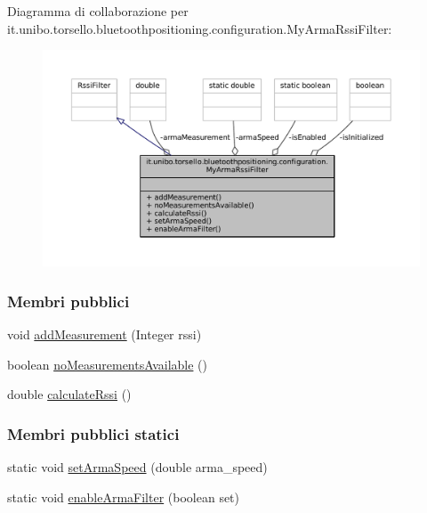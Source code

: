 Diagramma di collaborazione per it.\+unibo.\+torsello.\+bluetoothpositioning.\+configuration.\+My\+Arma\+Rssi\+Filter\+:
\nopagebreak
\begin{figure}[H]
\begin{center}
\leavevmode
\includegraphics[width=350pt]{classit_1_1unibo_1_1torsello_1_1bluetoothpositioning_1_1configuration_1_1MyArmaRssiFilter__coll__graph}
\end{center}
\end{figure}
\subsubsection*{Membri pubblici}
\begin{DoxyCompactItemize}
\item 
void \hyperlink{classit_1_1unibo_1_1torsello_1_1bluetoothpositioning_1_1configuration_1_1MyArmaRssiFilter_ad35f023bd49df5d11db274ad6a900072_ad35f023bd49df5d11db274ad6a900072}{add\+Measurement} (Integer rssi)
\item 
boolean \hyperlink{classit_1_1unibo_1_1torsello_1_1bluetoothpositioning_1_1configuration_1_1MyArmaRssiFilter_a822204c28f67229cabce721dd39d8cf6_a822204c28f67229cabce721dd39d8cf6}{no\+Measurements\+Available} ()
\item 
double \hyperlink{classit_1_1unibo_1_1torsello_1_1bluetoothpositioning_1_1configuration_1_1MyArmaRssiFilter_afcb40e796f16bc1352d34567e8984a87_afcb40e796f16bc1352d34567e8984a87}{calculate\+Rssi} ()
\end{DoxyCompactItemize}
\subsubsection*{Membri pubblici statici}
\begin{DoxyCompactItemize}
\item 
static void \hyperlink{classit_1_1unibo_1_1torsello_1_1bluetoothpositioning_1_1configuration_1_1MyArmaRssiFilter_a87e5ed9b294bed2cedcbda1ee06bc8ee_a87e5ed9b294bed2cedcbda1ee06bc8ee}{set\+Arma\+Speed} (double arma\+\_\+speed)
\item 
static void \hyperlink{classit_1_1unibo_1_1torsello_1_1bluetoothpositioning_1_1configuration_1_1MyArmaRssiFilter_a0ce35b24ad6c6d9abe69e038b3e8da7d_a0ce35b24ad6c6d9abe69e038b3e8da7d}{enable\+Arma\+Filter} (boolean set)
\end{DoxyCompactItemize}
